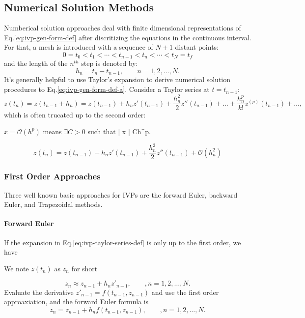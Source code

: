 \documentclass[letterpaper, 11pt]{article}
\providecommand{\note}[1]{\sidenote{{\footnotesize #1}}}
\begin{document}
\subsection{Numerical Solution Methods}
\label{sec-1-1}
Numberical solution approaches deal with finite dimensional representations of Eq.\eqref{eq:ivp-gen-form-def} after discritizing the equations in the continuous interval. For that, a
mesh is introduced with a sequence of $N+1$ distant points:
\begin{equation}
\label{eq:ivp-mesh-def}
0=t_{0}<t_{1}<\cdots<t_{n-1}<t_{n}<\cdots<t_{N}=t_{f}
\end{equation} 
and the length of the $n^{th}$ step is denoted by:
\begin{equation}
\label{eq:ivp-step-size-def}
h_{n} = t_{n} - t_{n-1}, \qquad n=1,2,\ldots,N.
\end{equation} 
It's generally helpful to use Taylor's expansion to derive numerical solution procedures to Eq.\eqref{eq:ivp-gen-form-def-a}. Consider a Taylor series at $t=t_{n-1}$: 
\begin{equation}
\label{eq:ivp-taylor-series-def}
z(t_{n}) = z(t_{n-1} + h_{n}) = z(t_{n-1}) + h_{n}z'(t_{n-1}) + \frac{h^{2}_{n}}{2}z''(t_{n-1}) + \ldots + \frac{h^{p}_{n}}{k!}z^{(p)}(t_{n-1}) + \ldots,
\end{equation}
which is often trucated up to the second order:
\begin{margintable}
\footnotesize
$x=\mathcal{O}(h^{p})$ means $\exists C>0$ such that \left | x \right | \leqslant Ch^{p}.
\end{margintable}
\begin{equation}
\label{eq:ivp-taylor-series-truc}
z(t_{n}) = z(t_{n-1}) + h_{n}z'(t_{n-1}) + \frac{h^{2}_{n}}{2}z''(t_{n-1}) + \mathcal{O}(h^{2}_{n})
\end{equation}
\subsubsection{First Order Approaches}
\label{sec-1-1-1}
Three well known basic approaches for IVPs are the forward Euler, backward Euler, and Trapezoidal methods.
\paragraph{Forward Euler}
\label{sec-1-1-1-1}
If the expansion in Eq.\eqref{eq:ivp-taylor-series-def} is only up to the first order, we have 
\begin{margintable}
\footnotesize
We note $z(t_{n})$ as $z_{n}$ for short
\end{margintable}
\begin{equation}
\label{eq:ivp-forward-euler}
z_{n} \approx z_{n-1} + h_{n}z'_{n-1}, \qquad, n=1,2,\ldots,N.
\end{equation}
Evaluate the derivative $z'_{n-1} = f(t_{n-1},z_{n-1})$ and use the first order approaxiation, and the forward Euler formula\note{This is an explicit formula} is
\begin{equation}
\label{eq:ivp-forward-euler-step}
z_{n} = z_{n-1} + h_{n}f(t_{n-1},z_{n-1}), \qquad, n=1,2,\ldots,N.
\end{equation} 
\end{document}
